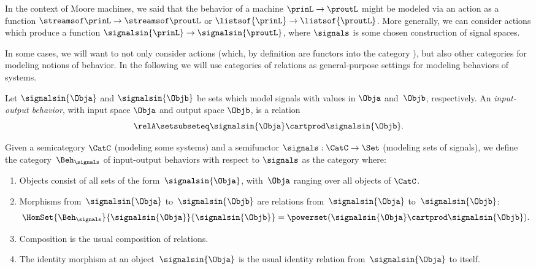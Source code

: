 
In the context of Moore machines, we said that the behavior of a machine $\prinL \to \proutL$ might be modeled via an action as a function $\streamsof\prinL  \to \streamsof\proutL$ or $\listsof{\prinL} \to \listsof{\proutL}$.
More generally, we can consider actions which produce a function $\signalsin{\prinL} \to \signalsin{\proutL}$, where $\signals$ is some chosen construction of signal spaces.

In some cases, we will want to not only consider actions (which, by definition are functors into the category \Set), but also other categories for modeling notions of behavior.
In the following we will use categories of relations as general-purpose settings for modeling behaviors of systems.

\begin{definition}
    Let $\signalsin{\Obja}$ and $\signalsin{\Objb}$ be sets which model signals with values in $\Obja$ and~$\Objb$, respectively.
    An \emph{input-output behavior}, with input space $\Obja$ and output space $\Objb$, is a relation
    \begin{equation}
        \relA \setsubseteq \signalsin{\Obja} \cartprod \signalsin{\Objb}.
    \end{equation}
\end{definition}

\begin{definition}
    \label{def:Beh}
    Given a semicategory $\CatC$ (modeling some systems) and a semifunctor $\signals: \CatC \to \Set$ (modeling sets of signals), we define the category~$\Beh_\signals$ of input-output behaviors with respect to $\signals$ as the category where:
    \begin{enumerate}
        \item Objects consist of all sets of the form~$\signalsin{\Obja}$, with~$\Obja$ ranging over all objects of $\CatC$.
        \item Morphisms from~$\signalsin{\Obja}$ to~$\signalsin{\Objb}$ are relations from~$\signalsin{\Obja}$ to~$\signalsin{\Objb}$:
              \begin{equation}
                  \HomSet{\Beh_\signals}{\signalsin{\Obja}}{\signalsin{\Objb}} = \powerset (\signalsin{\Obja} \cartprod \signalsin{\Objb}).
              \end{equation}
        \item Composition is the usual composition of relations.
        \item The identity morphism at an object~$\signalsin{\Obja}$ is the usual identity relation from~$\signalsin{\Obja}$ to itself.
    \end{enumerate}
\end{definition}

